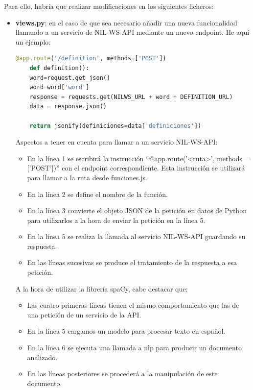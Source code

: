 Para ello, habría que realizar modificaciones en los siguientes ficheros:
\begin{itemize}
	\item \textbf{views.py}: en el caso de que sea necesario añadir una nueva funcionalidad llamando a un servicio de NIL-WS-API mediante un nuevo endpoint. He aquí un ejemplo:
	
			\begin{lstlisting}[language=python,firstnumber=1]
	@app.route('/definition', methods=['POST'])
	def definition():
	word=request.get_json()
	word=word['word']
	response = requests.get(NILWS_URL + word + DEFINITION_URL)
	data = response.json()
	
	return jsonify(definiciones=data['definiciones'])
	\end{lstlisting}

Aspectos a tener en cuenta para llamar a un servicio NIL-WS-API:
\begin{itemize}
	\item En la línea 1 se escribirá la instrucción ``$@$app.route('<ruta>', methods=['POST'])'' con el endpoint correspondiente. Esta instrucción se utilizará para llamar a la ruta desde funciones.js.
	\item En la línea 2 se define el nombre de la función.
	\item En la línea 3 convierte el objeto JSON de la petición en datos de Python para utilizarlos a la hora de enviar la petición en la línea 5.
	\item En la línea 5 se realiza la llamada al servicio NIL-WS-API guardando su respuesta.
	\item En las líneas sucesivas se produce el tratamiento de la respuesta a esa petición.
\end{itemize}

A la hora de utilizar la librería spaCy, cabe destacar que:

\begin{itemize}
	\item Las cuatro primeras líneas tienen el mismo comportamiento que las de una petición de un servicio de la API.
	\item En la línea 5 cargamos un modelo para procesar texto en español.
	\item En la línea 6 se ejecuta una llamada a nlp para producir un documento analizado.
	\item En las líneas posteriores se procederá a la manipulación de este documento.
\end{itemize}


\end{itemize}
